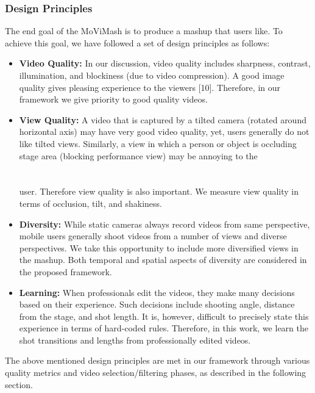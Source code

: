 \documentclass{sig-alternate}
\begin{document}
{{{\subsubsection{Design Principles}
The end goal of the MoViMash is to produce a mashup that users
like. To achieve this goal, we have followed a set of design principles
as follows:
\begin{itemize}
    \item \textbf{Video Quality: }In our discussion, video quality includes
sharpness, contrast, illumination, and blockiness (due to video
compression). A good image quality gives pleasing experience
to the viewers [10]. Therefore, in our framework we
give priority to good quality videos.
   \item \textbf{View Quality: }A video that is captured by a tilted camera
(rotated around horizontal axis) may have very good video
quality, yet, users generally do not like tilted views. Similarly,
a view in which a person or object is occluding stage
area (blocking performance view) may be annoying to the\\\\\\
user. Therefore view quality is also important. We measure
view quality in terms of occlusion, tilt, and shakiness.
   \item \textbf{Diversity: }While static cameras always record videos from
same perspective, mobile users generally shoot videos from
a number of views and diverse perspectives. We take this
opportunity to include more diversified views in the mashup.
Both temporal and spatial aspects of diversity are considered
in the proposed framework.
  \item \textbf{Learning: }When professionals edit the videos, they make
many decisions based on their experience. Such decisions
include shooting angle, distance from the stage, and shot
length. It is, however, difficult to precisely state this experience
in terms of hard-coded rules. Therefore, in this work,
we learn the shot transitions and lengths from professionally
edited videos.
\end{itemize}
The above mentioned design principles are met in our framework
through various quality metrics and video selection/filtering phases,
as described in the following section.

}}}
\end{document}
